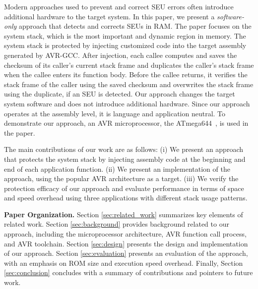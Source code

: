 Modern approaches used to prevent and correct SEU errors often introduce additional hardware to the target system. In this paper, we present a {\em software-only} approach that detects and corrects SEUs in RAM. The paper focuses on the system stack, which is the most important and dynamic region in memory. The system stack is protected by injecting customized code into the target assembly generated by AVR-GCC. After injection, each callee computes and saves the checksum of its caller's current stack frame and duplicates the caller's stack frame when the callee enters its function body. Before the callee returns, it verifies the stack frame of the caller using the saved checksum and overwrites the stack frame using the duplicate, if an SEU is detected. Our approach changes the target system software and does not introduce additional hardware. Since our approach operates at the assembly level, it is language and application neutral. To demonstrate our approach, an AVR microprocessor, the ATmega644~\cite{atmel:avr}, is used in the paper. 

The main contributions of our work are as follows: (i) We present an approach that protects the system stack by injecting assembly code at the beginning and end of each application function. (ii) We present an implementation of the approach, using the popular AVR architecture as a target. (iii) We verify the protection efficacy of our approach and evaluate performance in terms of space and speed overhead using three applications with different stack usage patterns.


{\bf Paper Organization.} Section \ref{sec:related_work} summarizes key elements of related work. Section \ref{sec:background} provides background related to our approach, including the microprocessor architecture, AVR function call process, and AVR toolchain. Section \ref{sec:design} presents the design and implementation of our approach. Section \ref{sec:evaluation} presents an evaluation of the approach, with an emphasis on ROM size and execution speed overhead. Finally, Section \ref{sec:conclusion} concludes with a summary of contributions and pointers to future work.